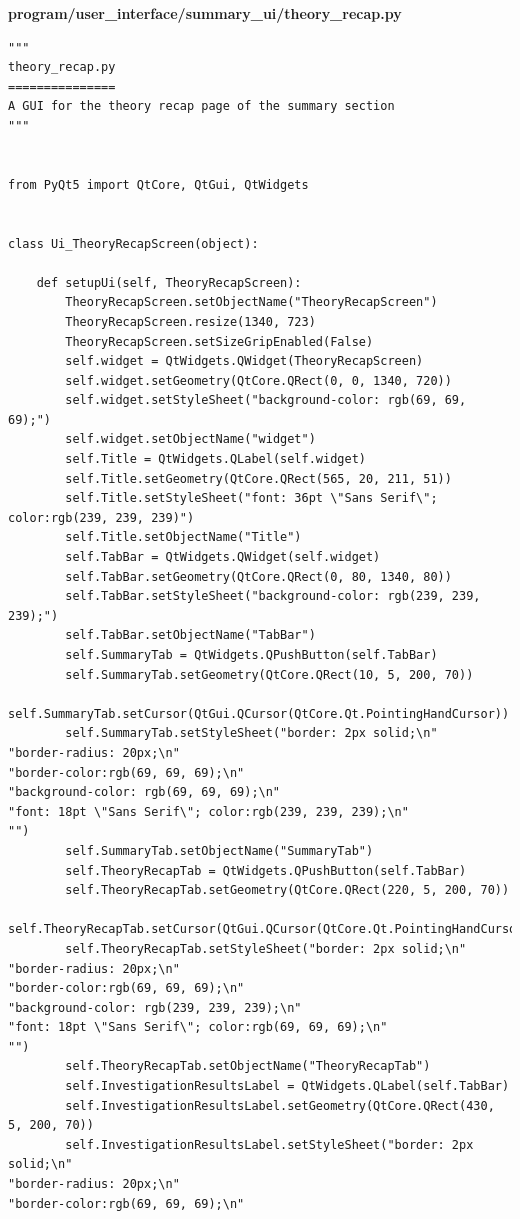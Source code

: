 \documentclass{article}
\begin{document}
\textbf{program/user\_interface/summary\_ui/theory\_recap.py}
\begin{lstlisting}
"""
theory_recap.py
===============
A GUI for the theory recap page of the summary section
"""


from PyQt5 import QtCore, QtGui, QtWidgets


class Ui_TheoryRecapScreen(object):

    def setupUi(self, TheoryRecapScreen):
        TheoryRecapScreen.setObjectName("TheoryRecapScreen")
        TheoryRecapScreen.resize(1340, 723)
        TheoryRecapScreen.setSizeGripEnabled(False)
        self.widget = QtWidgets.QWidget(TheoryRecapScreen)
        self.widget.setGeometry(QtCore.QRect(0, 0, 1340, 720))
        self.widget.setStyleSheet("background-color: rgb(69, 69, 69);")
        self.widget.setObjectName("widget")
        self.Title = QtWidgets.QLabel(self.widget)
        self.Title.setGeometry(QtCore.QRect(565, 20, 211, 51))
        self.Title.setStyleSheet("font: 36pt \"Sans Serif\"; color:rgb(239, 239, 239)")
        self.Title.setObjectName("Title")
        self.TabBar = QtWidgets.QWidget(self.widget)
        self.TabBar.setGeometry(QtCore.QRect(0, 80, 1340, 80))
        self.TabBar.setStyleSheet("background-color: rgb(239, 239, 239);")
        self.TabBar.setObjectName("TabBar")
        self.SummaryTab = QtWidgets.QPushButton(self.TabBar)
        self.SummaryTab.setGeometry(QtCore.QRect(10, 5, 200, 70))
        self.SummaryTab.setCursor(QtGui.QCursor(QtCore.Qt.PointingHandCursor))
        self.SummaryTab.setStyleSheet("border: 2px solid;\n"
"border-radius: 20px;\n"
"border-color:rgb(69, 69, 69);\n"
"background-color: rgb(69, 69, 69);\n"
"font: 18pt \"Sans Serif\"; color:rgb(239, 239, 239);\n"
"")
        self.SummaryTab.setObjectName("SummaryTab")
        self.TheoryRecapTab = QtWidgets.QPushButton(self.TabBar)
        self.TheoryRecapTab.setGeometry(QtCore.QRect(220, 5, 200, 70))
        self.TheoryRecapTab.setCursor(QtGui.QCursor(QtCore.Qt.PointingHandCursor))
        self.TheoryRecapTab.setStyleSheet("border: 2px solid;\n"
"border-radius: 20px;\n"
"border-color:rgb(69, 69, 69);\n"
"background-color: rgb(239, 239, 239);\n"
"font: 18pt \"Sans Serif\"; color:rgb(69, 69, 69);\n"
"")
        self.TheoryRecapTab.setObjectName("TheoryRecapTab")
        self.InvestigationResultsLabel = QtWidgets.QLabel(self.TabBar)
        self.InvestigationResultsLabel.setGeometry(QtCore.QRect(430, 5, 200, 70))
        self.InvestigationResultsLabel.setStyleSheet("border: 2px solid;\n"
"border-radius: 20px;\n"
"border-color:rgb(69, 69, 69);\n"

\end{lstlisting}
\end{document}
